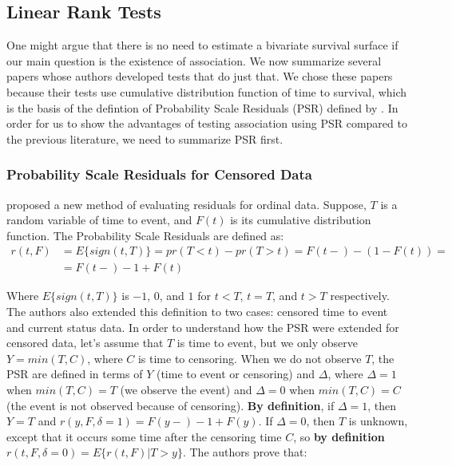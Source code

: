 \documentclass[]{article}
\begin{document}

\subsection{Linear Rank Tests}
One might argue that there is no need to estimate a bivariate survival surface if our main question is the existence of association. We now summarize several papers whose authors developed tests that do just that. We chose these papers because their tests use cumulative distribution function of time to survival, which is the basis of the defintion of Probability Scale Residuals (PSR) defined by \cite{li2012new}. In order for us to show the advantages of testing association using PSR compared to the previous literature, we need to summarize PSR first.

\subsubsection{Probability Scale Residuals for Censored Data}

\cite{li2012new} proposed a new method of evaluating residuals for ordinal data. Suppose, $T$ is a random variable of time to event, and $F(t)$ is its cumulative distribution function. The Probability Scale Residuals are defined as:\\
$$
\begin{aligned}
	r(t,F) &= E\{sign(t,T)\} = pr(T < t) - pr(T > t) = F(t-) - (1-F(t)) =\\
	 &=F(t-) - 1 + F(t)
	\end{aligned}
$$

Where $E\{sign(t,T)\}$ is $-1$, $0$, and $1$ for $t<T$, $t=T$, and $t>T$ respectively.
The authors also extended this definition to two cases: censored time to event and current status data. In order to understand how the PSR were extended for censored data, let's assume that $T$ is time to event, but we only observe $Y = min(T, C)$, where $C$ is time to censoring. When we do not observe $T$, the PSR are defined in terms of $Y$ (time to event or censoring) and $\Delta$, where $\Delta = 1$ when $min(T, C)=T$ (we observe the event) and $\Delta =0$ when $min(T, C)=C$ (the event is not observed because of censoring). \textbf{By definition}, if $\Delta = 1$, then $Y=T$ and $r(y,F, \delta=1) = F(y-) - 1 + F(y)$. If $\Delta = 0$, then $T$ is unknown, except that it occurs some time after the censoring time $C$, so \textbf{by definition} $r(t,F, \delta=0) = E\{r(t,F)|T>y\}$. The authors prove that:
\end{document}
